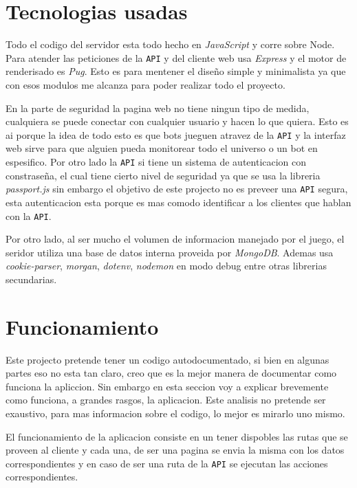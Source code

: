 \documentclass{article}
\begin{document}
\section{Tecnologias usadas}

Todo el codigo del servidor esta todo hecho en \textit{JavaScript} y corre sobre Node. Para atender las peticiones de la \texttt{API} y del cliente web usa \textit{Express} y el motor de renderisado es \textit{Pug}. Esto es para mentener el diseño simple y minimalista ya que con esos modulos me alcanza para poder realizar todo el proyecto.

En la parte de seguridad la pagina web no tiene ningun tipo de medida, cualquiera se puede conectar con cualquier usuario y hacen lo que quiera. Esto es ai porque la idea de todo esto es que bots jueguen atravez de la \texttt{API} y la interfaz web sirve para que alguien pueda monitorear todo el universo o un bot en espesifico. Por otro lado la \texttt{API} si tiene un sistema de autenticacion con constraseña, el cual tiene cierto nivel de seguridad ya que se usa la libreria \textit{passport.js} sin embargo el objetivo de este projecto no es preveer una \texttt{API} segura, esta autenticacion esta porque es mas comodo identificar a los clientes que hablan con la \texttt{API}.

Por otro lado, al ser mucho el volumen de informacion manejado por el juego, el seridor utiliza una base de datos interna proveida por \textit{MongoDB}. Ademas usa \textit{cookie-parser}, \textit{morgan}, \textit{dotenv}, \textit{nodemon} en modo debug entre otras librerias secundarias.

\section{Funcionamiento}
Este projecto pretende tener un codigo autodocumentado, si bien en algunas partes eso no esta tan claro, creo que es la mejor manera de documentar como funciona la apliccion. Sin embargo en esta seccion voy a explicar brevemente como funciona, a grandes rasgos, la aplicacion. Este analisis no pretende ser exaustivo, para mas informacion sobre el codigo, lo mejor es mirarlo uno mismo.

El funcionamiento de la aplicacion consiste en un tener dispobles las rutas que se proveen al cliente y cada una, de ser una pagina se envia la misma con los datos correspondientes y en caso de ser una ruta de la \texttt{API} se ejecutan las acciones correspondientes. 

\end{document}
